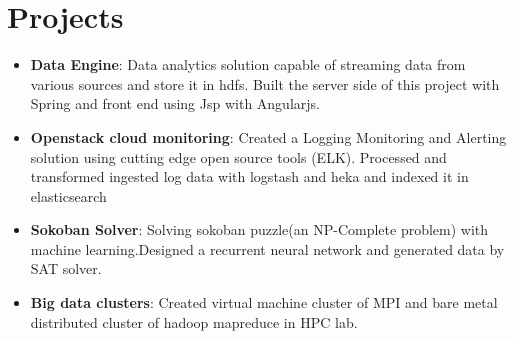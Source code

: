 \documentclass[letterpaper,11pt]{article}
\newcommand{\resumeItem}[2]{
  \item\small{
    \textbf{#1}{: #2 \vspace{-2pt}}
  }
}
\newcommand{\resumeSubItem}[2]{\resumeItem{#1}{#2}\vspace{-4pt}}
\newcommand{\resumeSubHeadingListStart}{\begin{itemize}[leftmargin=*]}
\newcommand{\resumeSubHeadingListEnd}{\end{itemize}}
\begin{document}
\section{Projects}
  \resumeSubHeadingListStart
    \resumeSubItem{Data Engine}
      {Data analytics solution capable of streaming data from various sources and store it in hdfs.
      Built the server side of this project with Spring and front end using Jsp with Angularjs.}
    \resumeSubItem{Openstack cloud monitoring}
      {Created a Logging Monitoring and Alerting solution using cutting edge open source tools (ELK).
      	Processed and transformed ingested log data with logstash and heka and indexed it in elasticsearch 
      }
    \resumeSubItem{Sokoban Solver}
      {Solving sokoban puzzle(an NP-Complete problem) with machine learning.Designed a recurrent neural network and generated data by SAT solver. 
      }
    \resumeSubItem{Big data clusters}
      {Created virtual machine cluster of MPI and bare metal distributed cluster of hadoop mapreduce in HPC lab.}
  \resumeSubHeadingListEnd

%


\end{document}
